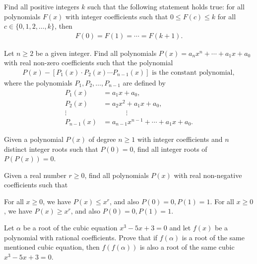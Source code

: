 \documentclass[12pt,a4paper]{memoir}
\theoremstyle{definition}
\begin{document}
\begin{question}[name={1997 IMO Shortlist}]
	Find all positive integers $k$ such that the following statement holds true: for all polynomials $F(x)$ with integer coefficients such that $0 \leq F(c) \leq k$ for all $c \in \{0,1,2,\dots,k\}$, then
	\begin{align*}
		F(0)=F(1)=\cdots = F(k+1).
	\end{align*}
\end{question}



\begin{question}[name={1996 Romania}]
	Let $n\geq 2$ be a given integer. Find all polynomials $P(x) = a_nx^n+\cdots+a_1x+a_0$ with real non-zero coefficients such that the polynomial
	\begin{align*}
		P(x) - [P_1(x)\cdot P_2(x) \cdots P_{n-1}(x)] \text{ is the constant polynomial},
	\end{align*}
	where the polynomials $P_1,P_2,\dots,P_{n-1}$ are defined by
	\begin{align*}
		P_1(x) &= a_1x + a_0,\\
		P_2(x) &= a_2x^2+a_1x+a_0,\\
		\vdots &\phantom{=} \qquad \vdots\\
		P_{n-1}(x) &= a_{n-1}x^{n-1} + \cdots + a_1x+a_0.
	\end{align*}
\end{question}

\begin{question}[name={1999 Iran TST}]
	Given a polynomial $P(x)$ of degree $n\geq 1$ with integer coefficients and $n$ distinct integer roots such that $P(0)=0$, find all integer roots of $P(P(x))=0$.
\end{question}


\begin{question}[name={1999 Iran TST}]
	Given a real number $r\geq 0$, find all polynomials $P(x)$ with real non-negative coefficients such that
	\begin{tasks}
		\task For all $x\geq 0$, we have $P(x) \leq x^r$, and also $P(0)=0, P(1)=1$.
		\task For all $x\geq 0$, we have $P(x) \geq x^r$, and also $P(0)=0, P(1)=1$.
	\end{tasks}
\end{question}


\begin{question}[name={1990 Iran}]
	Let $\alpha$ be a root of the cubic equation $x^3-5x+3=0$ and let $f(x)$ be a polynomial with rational coefficients. Prove that if $f(\alpha)$ is a root of the same mentioned cubic equation, then $f(f(\alpha))$ is also a root of the same cubic $x^3-5x+3=0$.
\end{question}
\end{document}
